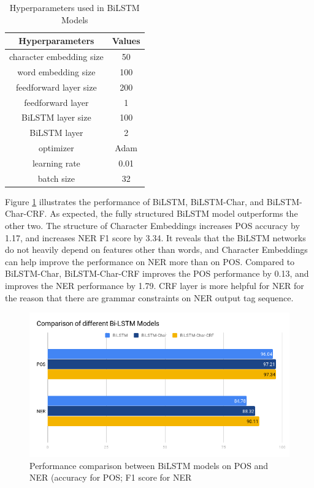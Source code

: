 \begin{table}[]
\centering
\caption{Hyperparameters used in BiLSTM Models}
\label{table:hyperparameters2}
\begin{tabular}{|c|c|}
\hline
Hyperparameters & Values \\ \hline
character embedding size & 50 \\ \hline
word embedding size & 100 \\ \hline
feedforward layer size & 200 \\ \hline
feedforward layer & 1 \\ \hline
BiLSTM layer size & 100 \\ \hline
BiLSTM layer & 2 \\ \hline 
optimizer & Adam \\ \hline
learning rate & 0.01 \\ \hline
batch size & 32 \\ \hline
\end{tabular}
\end{table}

Figure \ref{fig:lstmbar} illustrates the performance of BiLSTM, BiLSTM-Char, and BiLSTM-Char-CRF. As expected, the fully structured BiLSTM model outperforms the other two. The structure of Character Embeddings increases POS accuracy by 1.17, and increases NER F1 score by 3.34. It reveals that the BiLSTM networks do not heavily depend on features other than words, and Character Embeddings can help improve the performance on NER more than on POS. Compared to BiLSTM-Char, BiLSTM-Char-CRF improves the POS performance by 0.13, and improves the NER performance by 1.79. CRF layer is more helpful for NER for the reason that there are grammar constraints on NER output tag sequence.

\begin{figure}
  \centering
  \includegraphics[scale=0.6]{lstmbar.png}
 \caption{Performance comparison between BiLSTM models on POS and NER (accuracy for POS; F1 score for NER}
  \label{fig:lstmbar}
\end{figure}


